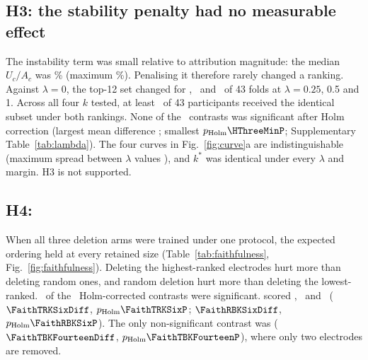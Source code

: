 \subsection{H3: the stability penalty had no measurable effect}
The instability term was small relative to attribution magnitude: the median $U_c/A_c$ was \UOverAMedian\% (maximum \UOverAMax\%). Penalising it therefore rarely changed a ranking. Against $\lambda = 0$, the top-12 set changed for \TopTwelveDiffersLambdaPtTwoFive, \TopTwelveDiffersLambdaPtFive\ and \TopTwelveDiffersLambdaOne\ of 43 folds at $\lambda = 0.25$, 0.5 and 1. Across all four $k$ tested, at least \HThreeMinTied\ of 43 participants received the identical subset under both rankings. None of the \HThreeNTests\ contrasts was significant after Holm correction (largest mean difference \HThreeMaxAbsDiff; smallest $p_{\mathrm{Holm}} \HThreeMinP$; Supplementary Table~\ref{tab:lambda}). The four curves in Fig.~\ref{fig:curve}a are indistinguishable (maximum spread between $\lambda$ values \LambdaCurveMaxSpread), and $k^*$ was identical under every $\lambda$ and margin. H3 is not supported. 

\subsection{H4: }
When all three deletion arms were trained under one protocol, the expected ordering held at every retained size (Table~\ref{tab:faithfulness}, Fig.~\ref{fig:faithfulness}). Deleting the highest-ranked electrodes hurt more than deleting random ones, and random deletion hurt more than deleting the lowest-ranked. \FaithNSig\ of the \FaithNTests\ Holm-corrected contrasts were significant.  scored \FaithTopKSix,  \FaithRandomKSix\ and  \FaithBottomKSix\ ( $\FaithTRKSixDiff$, $p_{\mathrm{Holm}} \FaithTRKSixP$;  $\FaithRBKSixDiff$, $p_{\mathrm{Holm}} \FaithRBKSixP$). The only non-significant contrast was  ($\FaithTBKFourteenDiff$, $p_{\mathrm{Holm}} \FaithTBKFourteenP$), where only two electrodes are removed. 

